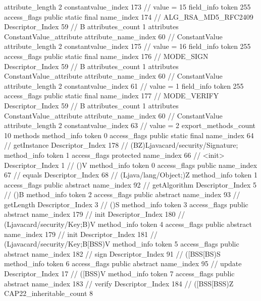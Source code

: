 {{{{{{{					attribute_length	2
					constantvalue_index	173		// value = 15
				}
				}
			}
			field_info {
				token	255
				access_flags	public static final
				name_index	174		// ALG_RSA_MD5_RFC2409
				Descriptor_Index	59		// B
				attributes_count	1
				attributes {
				ConstantValue_attribute {
					attribute_name_index	60		// ConstantValue
					attribute_length	2
					constantvalue_index	175		// value = 16
				}
				}
			}
			field_info {
				token	255
				access_flags	public static final
				name_index	176		// MODE_SIGN
				Descriptor_Index	59		// B
				attributes_count	1
				attributes {
				ConstantValue_attribute {
					attribute_name_index	60		// ConstantValue
					attribute_length	2
					constantvalue_index	61		// value = 1
				}
				}
			}
			field_info {
				token	255
				access_flags	public static final
				name_index	177		// MODE_VERIFY
				Descriptor_Index	59		// B
				attributes_count	1
				attributes {
				ConstantValue_attribute {
					attribute_name_index	60		// ConstantValue
					attribute_length	2
					constantvalue_index	63		// value = 2
				}
				}
			}
			}
			export_methods_count	10
			methods {
				method_info {
					token	0
					access_flags	public static final
					name_index	64		// getInstance
					Descriptor_Index	178		// (BZ)Ljavacard/security/Signature;
				}
				method_info {
					token	1
					access_flags	protected
					name_index	66		// <init>
					Descriptor_Index	1		// ()V
				}
				method_info {
					token	0
					access_flags	public
					name_index	67		// equals
					Descriptor_Index	68		// (Ljava/lang/Object;)Z
				}
				method_info {
					token	1
					access_flags	public abstract
					name_index	92		// getAlgorithm
					Descriptor_Index	5		// ()B
				}
				method_info {
					token	2
					access_flags	public abstract
					name_index	93		// getLength
					Descriptor_Index	3		// ()S
				}
				method_info {
					token	3
					access_flags	public abstract
					name_index	179		// init
					Descriptor_Index	180		// (Ljavacard/security/Key;B)V
				}
				method_info {
					token	4
					access_flags	public abstract
					name_index	179		// init
					Descriptor_Index	181		// (Ljavacard/security/Key;B[BSS)V
				}
				method_info {
					token	5
					access_flags	public abstract
					name_index	182		// sign
					Descriptor_Index	91		// ([BSS[BS)S
				}
				method_info {
					token	6
					access_flags	public abstract
					name_index	95		// update
					Descriptor_Index	17		// ([BSS)V
				}
				method_info {
					token	7
					access_flags	public abstract
					name_index	183		// verify
					Descriptor_Index	184		// ([BSS[BSS)Z
				}
			}
			CAP22_inheritable_count	8
		}
	}
}

